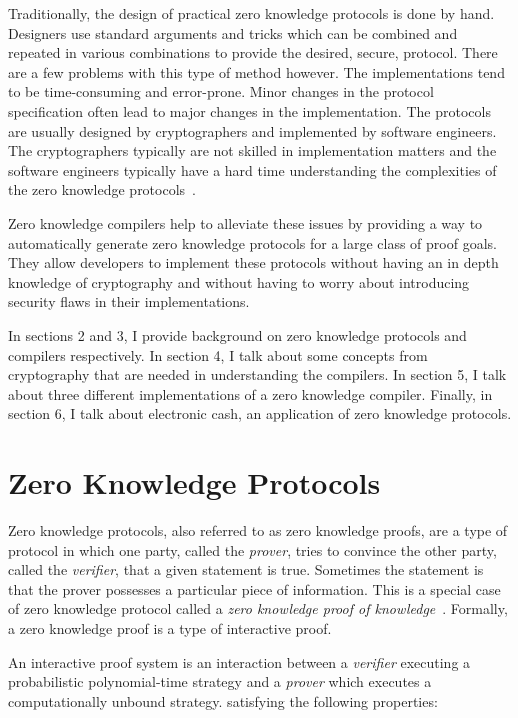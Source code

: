 \documentclass{sig-alternate}
\begin{document}
	Traditionally, the design of practical zero knowledge protocols
	is done by hand. Designers use standard arguments and tricks which
	can be combined and repeated in various combinations to provide the 
	desired, secure, protocol. There are a few problems with this type
	of method however. The implementations tend to be time-consuming
	and error-prone. Minor changes in the protocol specification often
	lead to major changes in the implementation. The protocols are usually
	designed by cryptographers and implemented by software engineers. The
	cryptographers typically are not skilled in implementation matters and
	the software engineers typically have a hard time understanding the
	complexities of the zero knowledge protocols~\cite{Sigma:2009}. 

	Zero knowledge compilers help to alleviate these issues by providing
	a way to automatically generate zero knowledge protocols for a large
	class of proof goals. They allow developers to implement these protocols
	without having an in depth knowledge of cryptography and without having to
	worry about introducing security flaws in their implementations.

	In sections 2 and 3, I provide background on zero knowledge protocols and
	compilers respectively. In section 4, I talk about some concepts from
	cryptography that are needed in understanding the compilers.
	In section 5, I talk about three different implementations of a zero knowledge 
	compiler. Finally, in section 6, I talk about electronic cash, an application 
	of zero knowledge protocols.

\section{Zero Knowledge Protocols}
	Zero knowledge protocols, also referred to as zero knowledge proofs, are a type
	of protocol in which one party, called the \textit{prover}, tries to convince the 
	other party, called the \textit{verifier}, that a given statement is true. Sometimes
	the statement is that the prover possesses a particular piece of information. This
	is a special case of zero knowledge protocol called a \textit{zero knowledge proof
	of knowledge}~\cite{Wiki}. Formally, a zero knowledge proof is a type of interactive
	proof.
	
	An interactive proof system is an interaction between a
	\textit{verifier} executing a probabilistic polynomial-time strategy and
	a \textit{prover} which executes a computationally unbound strategy.
	satisfying the following properties:
			
\end{document}
